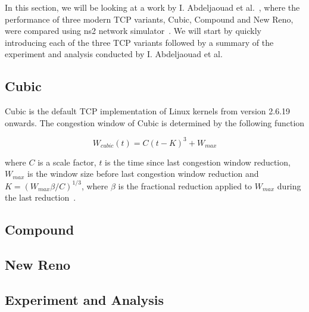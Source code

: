 In this section, we will be looking at a work by I. Abdeljaouad et al.~\cite{Abdeljaouad10}, where the performance of three modern TCP variants, Cubic, Compound and New Reno, were compared using ns2 network simulator~\cite{Singh12}. We will start by quickly introducing each of the three TCP variants followed by a summary of the experiment and analysis conducted by I. Abdeljaouad et al.

\subsection{Cubic}

Cubic is the default TCP implementation of Linux kernels from version 2.6.19 onwards. The congestion window of Cubic is determined by the following function

\[
W_{cubic}(t) = C(t - K)^3 + W_{max}   
\]

where $C$ is a scale factor, $t$ is the time since last congestion window reduction, $W_{max}$ is the window size before last congestion window reduction and $K = (W_{max} \beta / C)^{1 / 3}$, where $\beta$ is the fractional reduction applied to $W_{max}$ during the last reduction~\cite{Ha08}. 

\subsection{Compound}
 
\subsection{New Reno}

\subsection{Experiment and Analysis}

